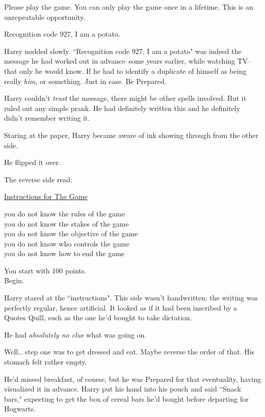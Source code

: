 \begin{writtenNote}

Please play the game. You can only play the game once in a lifetime. This is an unrepeatable opportunity.

Recognition code 927, I am a potato.

\end{writtenNote}

Harry nodded slowly. ``Recognition code 927, I am a potato" was indeed the message he had worked out in advance\---some years earlier, while watching TV\---that only he would know. If he had to identify a duplicate of himself as being really \emph{him}, or something. Just in case. Be Prepared.

Harry couldn't \emph{trust} the message, there might be other spells involved. But it ruled out any simple prank. He had definitely written this and he definitely didn't remember writing it.

Staring at the paper, Harry became aware of ink showing through from the other side.

He flipped it over.

The reverse side read:

\begin{writtenNote}
\underline{Instructions for The Game}

you do not know the rules of the game\\
you do not know the stakes of the game\\
you do not know the objective of the game\\
you do not know who controls the game\\
you do not know how to end the game

You start with 100 points.\\
Begin.
\end{writtenNote}

Harry stared at the ``instructions". This side wasn't handwritten; the writing was perfectly regular, hence artificial. It looked as if it had been inscribed by a Quotes Quill, such as the one he'd bought to take dictation.

He had \emph{absolutely no clue} what was going on.

Well{\ldots} step one was to get dressed and eat. Maybe reverse the order of that. His stomach felt rather empty.

He'd missed breakfast, of course, but he was Prepared for that eventuality, having visualized it in advance. Harry put his hand into his pouch and said ``Snack bars," expecting to get the box of cereal bars he'd bought before departing for Hogwarts.

